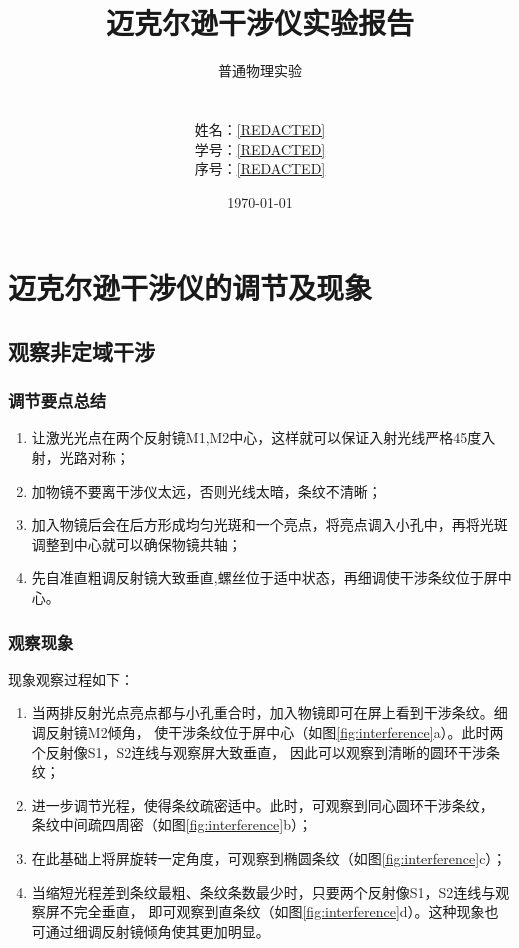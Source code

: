 \documentclass[12pt]{article}
\title{\Large\textbf{迈克尔逊干涉仪实验报告}}
\author{普通物理实验\\
        [REDACTED]\\
         \\
        姓名：\underline{\hspace{1cm}[REDACTED]\hspace{1cm}} \\
        学号：\underline{\hspace{0.5cm}[REDACTED]\hspace{0.5cm}} \\
        序号：\underline{\hspace{1.3cm}[REDACTED]\hspace{1.3cm}}}
\date{\today}
\begin{document}
\maketitle
\section{迈克尔逊干涉仪的调节及现象}
\subsection{观察非定域干涉}
\subsubsection{调节要点总结}
\begin{enumerate}
    \item 让激光光点在两个反射镜M1,M2中心，这样就可以保证入射光线严格45度入射，光路对称；
    \item 加物镜不要离干涉仪太远，否则光线太暗，条纹不清晰；
    \item 加入物镜后会在后方形成均匀光斑和一个亮点，将亮点调入小孔中，再将光斑调整到中心就可以确保物镜共轴；
    \item 先自准直粗调反射镜大致垂直,螺丝位于适中状态，再细调使干涉条纹位于屏中心。
\end{enumerate}
\subsubsection{观察现象}
现象观察过程如下：

\begin{enumerate}
    \item 当两排反射光点亮点都与小孔重合时，加入物镜即可在屏上看到干涉条纹。细调反射镜M2倾角，
    使干涉条纹位于屏中心（如图\ref{fig:interference}a）。此时两个反射像S1，S2连线与观察屏大致垂直，
    因此可以观察到清晰的圆环干涉条纹；

    \item 进一步调节光程，使得条纹疏密适中。此时，可观察到同心圆环干涉条纹，
    条纹中间疏四周密（如图\ref{fig:interference}b）；

    \item 在此基础上将屏旋转一定角度，可观察到椭圆条纹（如图\ref{fig:interference}c）；

    \item 当缩短光程差到条纹最粗、条纹条数最少时，只要两个反射像S1，S2连线与观察屏不完全垂直，
    即可观察到直条纹（如图\ref{fig:interference}d）。这种现象也可通过细调反射镜倾角使其更加明显。
\end{enumerate}
\end{document}
